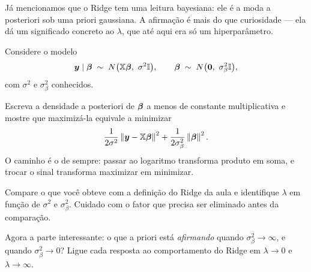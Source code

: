 Já mencionamos que o Ridge tem uma leitura bayesiana: ele é a moda a
posteriori sob uma priori gaussiana. A afirmação é mais do que curiosidade ---
ela dá um significado concreto ao $\lambda$, que até aqui era só um hiperparâmetro.

Considere o modelo
\[
  \bm y \mid \bm{\beta} \;\sim\; N\big(\mathbb{X}\bm{\beta},\ \sigma^2\mathbb{I}\big),
  \qquad
  \bm{\beta} \;\sim\; N\big(\bm 0,\ \sigma_\beta^2\mathbb{I}\big),
\]
com $\sigma^2$ e $\sigma_\beta^2$ conhecidos.
\begin{itens}
  \item {} Escreva a densidade a posteriori de $\bm{\beta}$ a menos de
        constante multiplicativa e mostre que maximizá-la equivale a minimizar
        \[
          \frac{1}{2\sigma^2}\left\lVert \bm y-\mathbb{X}\bm{\beta} \right\rVert^2
          + \frac{1}{2\sigma_\beta^2}\left\lVert \bm{\beta} \right\rVert^2 .
        \]
        O caminho é o de sempre: passar ao logaritmo transforma produto em soma, e
        trocar o sinal transforma maximizar em minimizar.
  \item {} Compare o que você obteve com a definição do Ridge da aula e
        identifique $\lambda$ em função de $\sigma^2$ e $\sigma_\beta^2$. Cuidado
        com o fator que precisa ser eliminado antes da comparação.
  \item {} Agora a parte interessante: o que a priori está \emph{afirmando}
        quando $\sigma_\beta^2\to\infty$, e quando $\sigma_\beta^2\to 0$? Ligue
        cada resposta ao comportamento do Ridge em $\lambda\to 0$ e
        $\lambda\to\infty$.
\end{itens}

